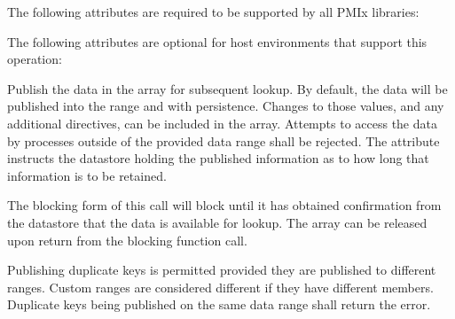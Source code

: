 \returnsimple

\reqattrstart
The following attributes are required to be supported by all PMIx libraries:

\reqattrend

\optattrstart
The following attributes are optional for host environments that support this operation:


\optattrend

\descr

Publish the data in the  array for subsequent lookup.
By default, the data will be published into the  range and with  persistence.
Changes to those values, and any additional directives, can be included in the  array. Attempts to access the data by processes outside of the provided data range shall be rejected. The  attribute instructs the datastore holding the published information as to how long that information is to be retained.

The blocking form of this call will block until it has obtained confirmation from the datastore that the data is available for lookup. The  array can be released upon return from the blocking function call.

Publishing duplicate keys is permitted provided they are published to different
ranges. Custom ranges are considered different if they have different members.
Duplicate keys being published on the same data range shall return the
 error.

